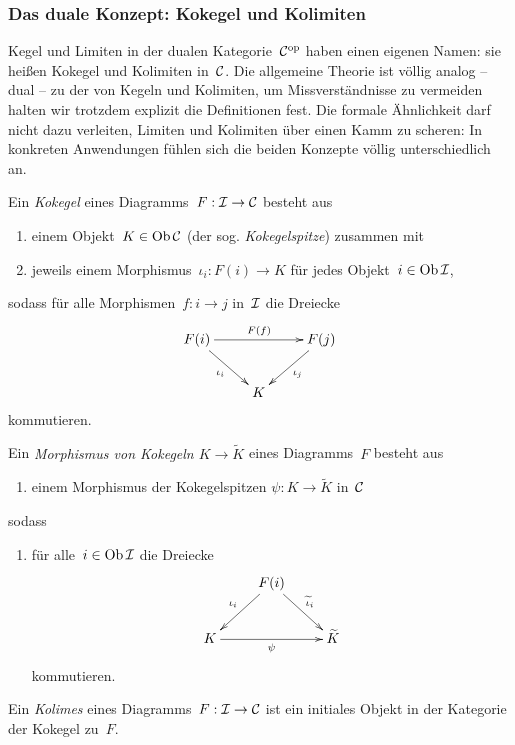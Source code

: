 \subsubsection*{Das duale Konzept: Kokegel und Kolimiten}

Kegel und Limiten in der dualen Kategorie~$\mathcal{C}^{\mathrm{op}}$ haben einen eigenen Namen:
sie heißen Kokegel und Kolimiten in~$\mathcal{C}$. Die allgemeine Theorie ist völlig
analog -- dual -- zu der von Kegeln und Kolimiten, um Missverständnisse zu
vermeiden halten wir trotzdem explizit die Definitionen fest. Die formale
Ähnlichkeit darf nicht dazu verleiten, Limiten und Kolimiten über einen Kamm zu
scheren: In konkreten Anwendungen fühlen sich die beiden Konzepte völlig
unterschiedlich an.

\begin{defn}Ein \emph{Kokegel} eines Diagramms~$F : \mathcal{I} \to \mathcal{C}$ besteht aus
\begin{enumerate}
\item einem Objekt~$K \in \operatorname{Ob} \mathcal{C}$ (der sog. \emph{Kokegelspitze}) zusammen mit
\item jeweils einem Morphismus~$\iota_i : F(i) \to K$ für jedes Objekt~$i \in \operatorname{Ob}\mathcal{I}$,
\end{enumerate}
sodass
für alle Morphismen~$f : i \to j$ in~$\mathcal{I}$ die Dreiecke
\[ \xymatrix{
  F(i) \ar[rd]_{\iota_i} \ar[rr]^{F(f)} && F(j) \ar[ld]^{\iota_j} \\
  & K
} \]
kommutieren.
\end{defn}

\begin{defn}Ein \emph{Morphismus von Kokegeln $K \to \widetilde K$} eines Diagramms~$F$ besteht aus
\begin{enumerate}
\item[] einem Morphismus der Kokegelspitzen $\psi : K \to \widetilde K$ in~$\mathcal{C}$
\end{enumerate}
sodass
\begin{enumerate}
\item[]
für alle~$i \in \operatorname{Ob}\mathcal{I}$ die Dreiecke
\[ \xymatrix{
  & F(i) \ar[ld]_{\iota_i} \ar[rd]^{\widetilde\iota_i} \\
  K \ar[rr]_{\psi} && \widetilde K
} \]
kommutieren.
\end{enumerate}
\end{defn}

\begin{defn}Ein \emph{Kolimes} eines Diagramms~$F:\mathcal{I}\to\mathcal{C}$ ist ein initiales
Objekt in der Kategorie der Kokegel zu~$F$.\end{defn}


